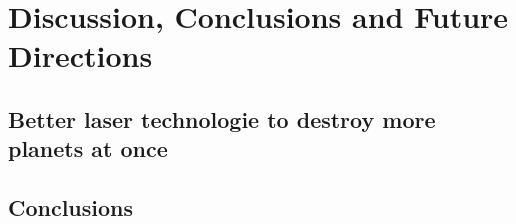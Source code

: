 \chapter{Discussion, Conclusions and Future Directions}
\section{Better laser technologie to destroy more planets at once}
\section{Conclusions}
